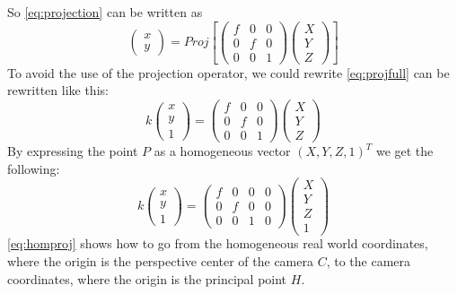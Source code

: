 So \autoref{eq:projection} can be written as
\begin{equation}\label{eq:projfull}
    \begin{pmatrix}
        x \\ y
    \end{pmatrix} = Proj\left[
    \begin{pmatrix}
        f & 0 & 0\\ 
        0 & f & 0\\ 
        0 & 0 & 1
    \end{pmatrix}
    \begin{pmatrix}
        X \\ Y \\ Z
    \end{pmatrix} \right]
\end{equation}
To avoid the use of the projection operator, we could rewrite \autoref{eq:projfull} can be rewritten like this:
\begin{equation}
    k
    \begin{pmatrix}
        x \\ y \\ 1
    \end{pmatrix} = 
    \begin{pmatrix}
        f & 0 & 0\\ 
        0 & f & 0\\ 
        0 & 0 & 1
    \end{pmatrix}
    \begin{pmatrix}
        X \\ Y \\ Z
    \end{pmatrix}
\end{equation}
By expressing the point $P$ as a homogeneous vector $(X, Y, Z, 1)^T$ we get the following:
\begin{equation}\label{eq:homproj}
    k
    \begin{pmatrix}
        x \\ y \\ 1
    \end{pmatrix} = 
    \begin{pmatrix}
        f & 0 & 0 & 0\\ 
        0 & f & 0 & 0\\ 
        0 & 0 & 1 & 0
    \end{pmatrix}
    \begin{pmatrix}
        X \\ Y \\ Z \\ 1
    \end{pmatrix}
\end{equation}
\autoref{eq:homproj} shows how to go from the homogeneous real world coordinates, where the origin is the perspective center of the camera $C$, to the camera coordinates, where the origin is the principal point $H$.\bigskip

